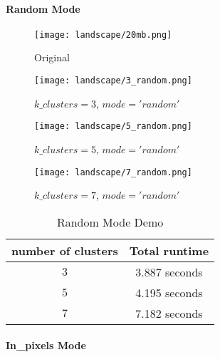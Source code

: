 \paragraph{Random Mode}
\quad 
\begin{figure}[htbp]
    \centering
    \begin{minipage}{0.45\textwidth}
        \centering
        \texttt{[image: landscape/20mb.png]}
        \caption{Original}
    \end{minipage}\hfill
    \begin{minipage}{0.45\textwidth}
        \centering
        \texttt{[image: landscape/3\_random.png]}
        \caption{$k\_clusters = 3$, $mode = 'random'$}
    \end{minipage}
    
    \vspace{0.5cm} %
    
    \begin{minipage}{0.45\textwidth}
        \centering
        \texttt{[image: landscape/5\_random.png]}
        \caption{$k\_clusters = 5$, $mode = 'random'$}
    \end{minipage}\hfill
    \begin{minipage}{0.45\textwidth}
        \centering
        \texttt{[image: landscape/7\_random.png]}
        \caption{$k\_clusters = 7$, $mode = 'random'$}
    \end{minipage}
\end{figure}
\begin{table}[htbp]
    \centering
    \begin{tabular}{|c|c|}
        \hline
        \textbf{number of clusters} & \textbf{Total runtime} \\
        \hline
        $3$ & 3.887 seconds \\
        \hline
        $5$ & 4.195 seconds \\
        \hline
        $7$ & 7.182 seconds \\
        \hline
    \end{tabular}
    \caption{Random Mode Demo}
    \label{tab:random_mode}
\end{table}
\clearpage 
\paragraph{In\_pixels Mode}
\quad 

